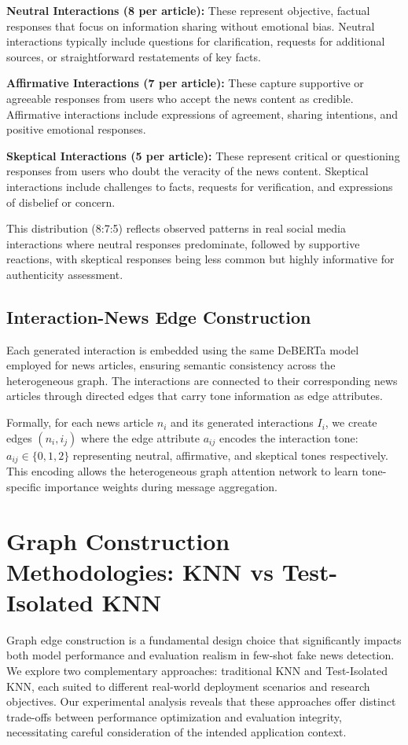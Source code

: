 \textbf{Neutral Interactions (8 per article):} These represent objective, factual responses that focus on information sharing without emotional bias. Neutral interactions typically include questions for clarification, requests for additional sources, or straightforward restatements of key facts.

\textbf{Affirmative Interactions (7 per article):} These capture supportive or agreeable responses from users who accept the news content as credible. Affirmative interactions include expressions of agreement, sharing intentions, and positive emotional responses.

\textbf{Skeptical Interactions (5 per article):} These represent critical or questioning responses from users who doubt the veracity of the news content. Skeptical interactions include challenges to facts, requests for verification, and expressions of disbelief or concern.

This distribution (8:7:5) reflects observed patterns in real social media interactions where neutral responses predominate, followed by supportive reactions, with skeptical responses being less common but highly informative for authenticity assessment.

\subsection{Interaction-News Edge Construction}

Each generated interaction is embedded using the same DeBERTa model employed for news articles, ensuring semantic consistency across the heterogeneous graph. The interactions are connected to their corresponding news articles through directed edges that carry tone information as edge attributes.

Formally, for each news article $n_i$ and its generated interactions $I_i$, we create edges $(n_i, i_j)$ where the edge attribute $a_{ij}$ encodes the interaction tone: $a_{ij} \in \{0, 1, 2\}$ representing neutral, affirmative, and skeptical tones respectively. This encoding allows the heterogeneous graph attention network to learn tone-specific importance weights during message aggregation.

\section{Graph Construction Methodologies: KNN vs Test-Isolated KNN}

Graph edge construction is a fundamental design choice that significantly impacts both model performance and evaluation realism in few-shot fake news detection. We explore two complementary approaches: traditional KNN and Test-Isolated KNN, each suited to different real-world deployment scenarios and research objectives. Our experimental analysis reveals that these approaches offer distinct trade-offs between performance optimization and evaluation integrity, necessitating careful consideration of the intended application context.

